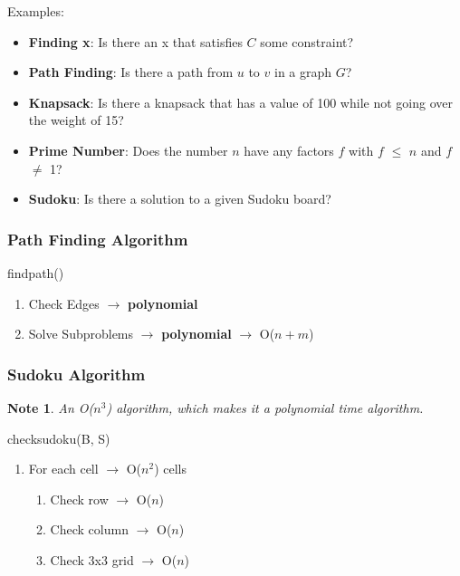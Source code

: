 \documentclass[twoside]{article}
\newtheorem{note}[theorem]{Note}
\begin{document}
Examples:
\begin{itemize}
    \item \textbf{Finding x}: Is there an x that satisfies $C$ some constraint?
    \item \textbf{Path Finding}: Is there a path from $u$ to $v$ in a graph $G$?
    \item \textbf{Knapsack}: Is there a knapsack that has a value of 100 while not going over the weight of 15?
    \item \textbf{Prime Number}: Does the number $n$ have any factors $f$ with $f$ $\leq$ $n$ and $f$ $\neq$ 1?
    \item \textbf{Sudoku}: Is there a solution to a given Sudoku board?
\end{itemize}

\subsubsection{Path Finding Algorithm}
\begin{algorithm}[H]
\caption*{{\sc findpath()}}
\begin{enumerate}
    \item Check Edges $\to$ {\textbf{polynomial}}
    \item Solve Subproblems $\to$ {\textbf{polynomial}} $\to$ O($n+m$)
\end{enumerate}
\end{algorithm}

\subsubsection{Sudoku Algorithm}

\begin{note}
    An O($n^3$) algorithm, which makes it a polynomial time algorithm.
\end{note}

\noindent{}
\begin{algorithm}[H]
\caption*{{\sc checksudoku(B, S)}}
\begin{enumerate}
    \item For each cell $\to$ O($n^2$) cells
    \begin{enumerate}
        \item Check row $\to$ O($n$)
        \item Check column $\to$ O($n$)
        \item Check 3x3 grid $\to$ O($n$)
    \end{enumerate}
\end{enumerate}
\end{algorithm} 
\end{document}
